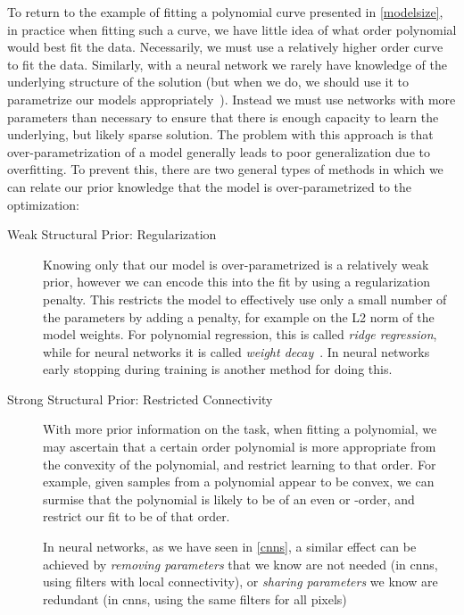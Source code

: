 \documentclass[thesis]{subfiles}
\begin{document}
	To return to the example of fitting a polynomial curve presented in \cref{modelsize}, in practice when fitting such a curve, we have little idea of what order polynomial would best fit the data. Necessarily, we must use a relatively higher order curve to fit the data. Similarly, with a neural network we rarely have knowledge of the underlying structure of the solution (but when we do, we should use it to parametrize our models appropriately~\citep{jain2016structural}). Instead we must use networks with more parameters than necessary to ensure that there is enough capacity to learn the underlying, but likely sparse solution. The problem with this approach is that over-parametrization of a model generally leads to poor generalization due to overfitting. To prevent this, there are two general types of methods in which we can relate our prior knowledge that the model is over-parametrized to the optimization:
	\begin{description}
	\item[Weak Structural Prior: Regularization]
	Knowing only that our model is over-parametrized is a relatively weak prior, however we can encode this into the fit by using a regularization penalty. This restricts the model to effectively use only a small number of the parameters by adding a penalty, for example on the L2 norm of the model weights. For polynomial regression, this is called \emph{ridge regression}, while for neural networks it is called \emph{weight decay}~\citep{hinton1987learning}. In neural networks early stopping during training is another method for doing this.
	
	\item[Strong Structural Prior: Restricted Connectivity]
	With more prior information on the task, \ie when fitting a polynomial, we may ascertain that a certain order polynomial is more appropriate from the convexity of the polynomial, and restrict learning to that order. For example, given samples from a polynomial appear to be convex, we can surmise that the polynomial is likely to be of an even or -order, and restrict our fit to be of that order. 

	In neural networks, as we have seen in \cref{cnns}, a similar effect can be achieved by \emph{removing parameters} that we know are not needed (\ie  in \glspl{cnn}, using filters with local connectivity), or \emph{sharing parameters} we know are redundant (\ie in \glspl{cnn}, using the same filters for all pixels)
    \end{description}
    
\end{document}
